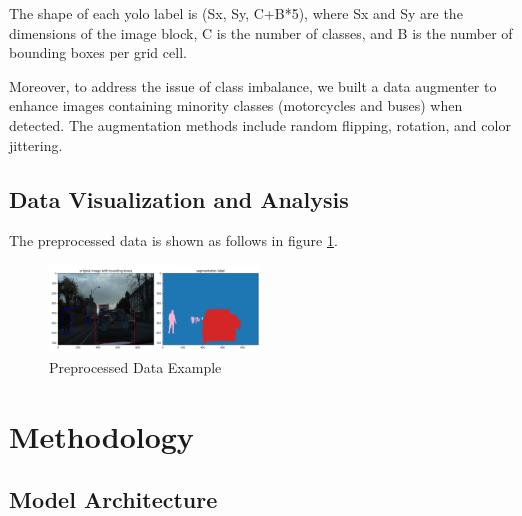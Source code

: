 \documentclass[conference]{IEEEtran}
\begin{document}

The shape of each yolo label is (Sx, Sy, C+B*5), where Sx and Sy are the dimensions of the image block, C is the number of classes, and B is the number of bounding boxes per grid cell.


Moreover, to address the issue of class imbalance, we built a data augmenter to enhance images containing minority classes (motorcycles and buses) when detected. The augmentation methods include random flipping, rotation, and color jittering.

\subsection{Data Visualization and Analysis}

The preprocessed data is shown as follows in figure \ref{fig:data}.

\begin{figure}[htbp]
    \centerline{\includegraphics[width=0.5\textwidth]{fig/data.png}}
    \caption{Preprocessed Data Example}
    \label{fig:data}
\end{figure}


\section{Methodology}
\subsection{Model Architecture}

\end{document}
